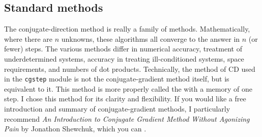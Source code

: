\subsection{Standard methods}
The conjugate-direction method is really a family of methods.
Mathematically, where there are $n$ unknowns, these algorithms all
converge to the answer in $n$ (or fewer) steps.  The various methods
differ in numerical accuracy, treatment of underdetermined systems,
accuracy in treating ill-conditioned systems, space requirements, and
numbers of dot products.  Technically, the method of CD used in the
\texttt{cgstep} module  is not the
conjugate-gradient method itself, but is equivalent to it.  This
method is more properly called the 
with a memory of one step.  I chose this method for its clarity and
flexibility.  If you would like a free introduction and summary of
conjugate-gradient methods, I particularly recommend {\it An
  Introduction to Conjugate Gradient Method Without Agonizing Pain }
by Jonathon Shewchuk, which you can .

